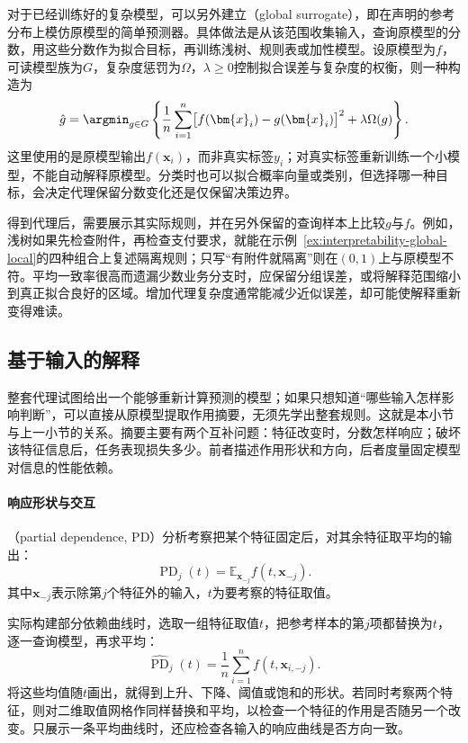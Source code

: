 对于已经训练好的复杂模型，可以另外建立（global surrogate），即在声明的参考分布上模仿原模型的简单预测器。具体做法是从该范围收集输入，查询原模型的分数，用这些分数作为拟合目标，再训练浅树、规则表或加性模型。设原模型为$f$，可读模型族为$G$，复杂度惩罚为$\Omega$，$\lambda\geq0$控制拟合误差与复杂度的权衡，则一种构造为
\begin{equation}
 \hat g=\argmin_{g\in G}\left\{
 \frac1n\sum_{i=1}^n\bigl[f(\bm{x}_i)-g(\bm{x}_i)\bigr]^2
 +\lambda\Omega(g)\right\}.
 \label{eq:interpretability-global-surrogate}
\end{equation}
这里使用的是原模型输出$f(\bm{x}_i)$，而非真实标签$y_i$；对真实标签重新训练一个小模型，不能自动解释原模型。分类时也可以拟合概率向量或类别，但选择哪一种目标，会决定代理保留分数变化还是仅保留决策边界。

得到代理后，需要展示其实际规则，并在另外保留的查询样本上比较$g$与$f$。例如，浅树如果先检查附件，再检查支付要求，就能在示例~\ref{ex:interpretability-global-local}的四种组合上复述隔离规则；只写“有附件就隔离”则在$(0,1)$上与原模型不符。平均一致率很高而遗漏少数业务分支时，应保留分组误差，或将解释范围缩小到真正拟合良好的区域。增加代理复杂度通常能减少近似误差，却可能使解释重新变得难读。

\subsection{基于输入的解释}
\label{sec:interpretability-global-dependence}

整套代理试图给出一个能够重新计算预测的模型；如果只想知道“哪些输入怎样影响判断”，可以直接从原模型提取作用摘要，无须先学出整套规则。这就是本小节与上一小节的关系。摘要主要有两个互补问题：特征改变时，分数怎样响应；破坏该特征信息后，任务表现损失多少。前者描述作用形状和方向，后者度量固定模型对信息的性能依赖。

\paragraph{响应形状与交互}

（partial dependence, PD）分析考察把某个特征固定后，对其余特征取平均的输出：
\[
 \operatorname{PD}_j(t)
 =\mathbb E_{\bm{x}_{-j}}f(t,\bm{x}_{-j}).
\]
其中$\bm{x}_{-j}$表示除第$j$个特征外的输入，$t$为要考察的特征取值。

实际构建部分依赖曲线时，选取一组特征取值$t$，把参考样本的第$j$项都替换为$t$，逐一查询模型，再求平均：
\[
 \widehat{\operatorname{PD}}_j(t)
 =\frac1n\sum_{i=1}^n f(t,\bm{x}_{i,-j}).
\]
将这些均值随$t$画出，就得到上升、下降、阈值或饱和的形状。若同时考察两个特征，则对二维取值网格作同样替换和平均，以检查一个特征的作用是否随另一个改变。只展示一条平均曲线时，还应检查各输入的响应曲线是否方向一致。

